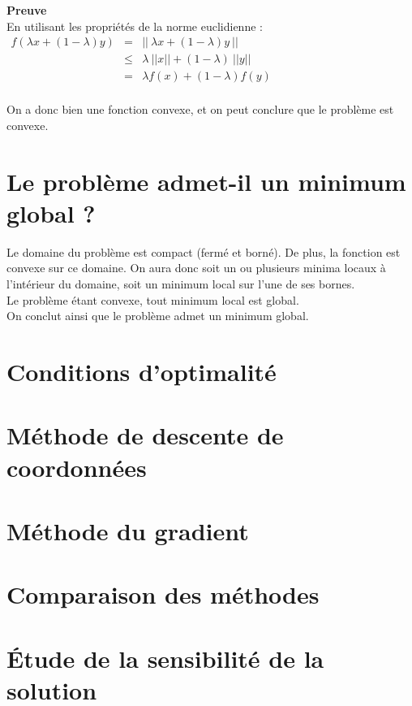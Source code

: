 \documentclass[12pt, a4paper]{report}
\begin{document}
\noindent
\textbf{Preuve}\\
En utilisant les propriétés de la norme euclidienne :\\
$\begin{array}{rcl}
f(\lambda x + (1-\lambda)y) & = & ||\ \lambda x + (1-\lambda)y\ ||\\
 & \leq & \lambda\ ||x|| + (1-\lambda)\ ||y||\\
 & = & \lambda f(x) + (1-\lambda)f(y)\\
\end{array}$

\noindent
\newline
On a donc bien une fonction convexe, et on peut conclure que le problème est convexe.\\


\section{Le problème admet-il un minimum global ?}
Le domaine du problème est compact (fermé et borné). De plus, la fonction est convexe sur ce domaine. On aura donc soit un ou plusieurs minima locaux à l'intérieur du domaine, soit un minimum local sur l'une de ses bornes.\\
Le problème étant convexe, tout minimum local est global.\\
On conclut ainsi que le problème admet un minimum global.\\

\section{Conditions d'optimalité}

\section{Méthode de descente de coordonnées}

\section{Méthode du gradient}

\section{Comparaison des méthodes}

\section{Étude de la sensibilité de la solution}
\end{document}
